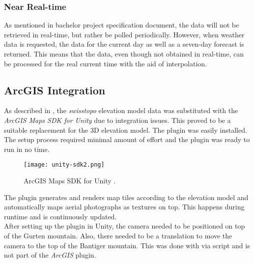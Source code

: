 \subsubsection{Near Real-time}
As mentioned in bachelor project specification document, the data will not be retrieved in real-time, but rather be polled periodically.
However, when weather data is requested, the data for the current day as well as a seven-day forecast is returned.
This means that the data, even though not obtained in real-time, can be processed for the real current time with the aid of \gls{interpolation}.

\subsection{ArcGIS Integration}
\label{section:techimpl:arcgis}
As described in , the \emph{swisstopo} elevation model data was substituted with the \emph{ArcGIS Maps SDK for Unity} due to integration issues.
This proved to be a suitable replacement for the 3D elevation model.
The plugin was easily installed. The setup process required minimal amount of effort and the plugin was ready to run in no time. 

\begin{figure}[H]
    \texttt{[image: unity-sdk2.png]}
    \caption{ArcGIS Maps SDK for Unity \protect\cite{arcgis:unitysdk}.}
\end{figure}

\noindent
The plugin generates and renders map tiles according to the elevation model and automatically maps aerial photographs as textures on top.
This happens during runtime and is continuously updated.
\\
After setting up the plugin in Unity, the camera needed to be positioned on top of the Gurten mountain. Also, there needed to be a translation to move the camera to the top of the Bantiger mountain.
This was done with via script and is not part of the \emph{ArcGIS} plugin.

